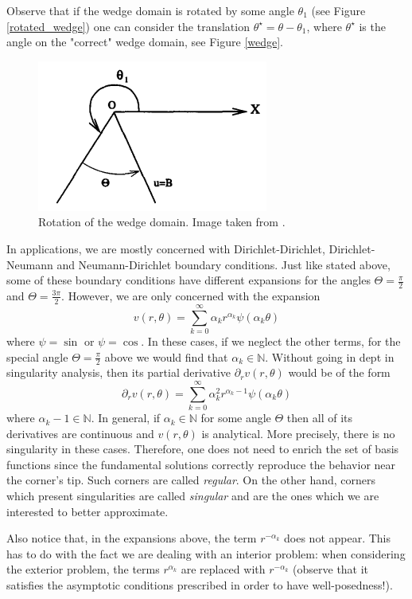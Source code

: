 \begin{remark}\label{particular_solutions}
    Observe that if the wedge domain is rotated by some angle \(\theta_1\) (see Figure \eqref{rotated_wedge}) one can consider the translation \(\theta^\star = \theta - \theta_1\), where \(\theta^\star\) is the angle on the "correct" wedge domain, see Figure \eqref{wedge}. 
    \begin{figure}[H]
        \centering
        \includegraphics[scale=0.5]{Images/rotated_wedge.png}
        \caption{Rotation of the wedge domain. Image taken from \cite{li2000singularities}.}
        \label{rotated_wedge}
    \end{figure}
    In applications, we are mostly concerned with Dirichlet-Dirichlet, Dirichlet-Neumann and Neumann-Dirichlet boundary conditions. Just like stated above, some of these boundary conditions have different expansions for the angles \(\Theta=\frac{\pi}{2}\) and \(\Theta=\frac{3\pi}{2}\). However, we are only concerned with the expansion
    \[
        v(r,\theta) = \sum_{k=0}^{\infty}\alpha_k r^{\alpha_k}\psi(\alpha_k \theta)
    \]
    where \(\psi=\sin\) or \(\psi = \cos\). In these cases, if we neglect the other terms, for the special angle \(\Theta = \frac{\pi}{2}\) above we would find that \(\alpha_k \in \mathbb{N}\). Without going in dept in singularity analysis, then its partial derivative \(\partial_r v(r,\theta)\) would be of the form 
    \[
        \partial_r v(r,\theta) = \sum_{k=0}^{\infty}\alpha_k^2 r^{\alpha_k-1}\psi(\alpha_k \theta)
    \]
    where \(\alpha_k-1 \in \mathbb{N}\). In general, if \(\alpha_k \in \mathbb{N}\) for some angle \(\Theta\) then all of its derivatives are continuous and \(v(r,\theta)\) is analytical. More precisely, there is no singularity in these cases. Therefore, one does not need to enrich the set of basis functions since the fundamental solutions correctly reproduce the behavior near the corner's tip. Such corners are called \textit{regular}. On the other hand, corners which present singularities are called \textit{singular} and are the ones which we are interested to better approximate. 

    Also notice that, in the expansions above, the term \(r^{-\alpha_k}\) does not appear. This has to do with the fact we are dealing with an interior problem: when considering the exterior problem, the terms \(r^{\alpha_k}\) are replaced with \(r^{-\alpha_k}\) (observe that it satisfies the asymptotic conditions prescribed in order to have well-posedness!).
\end{remark}

